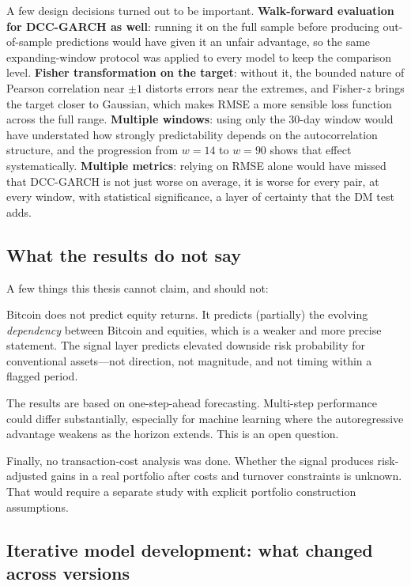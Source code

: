 A few design decisions turned out to be important. \textbf{Walk-forward evaluation for DCC-GARCH as well}: running it on the full sample before producing out-of-sample predictions would have given it an unfair advantage, so the same expanding-window protocol was applied to every model to keep the comparison level. \textbf{Fisher transformation on the target}: without it, the bounded nature of Pearson correlation near $\pm 1$ distorts errors near the extremes, and Fisher-$z$ brings the target closer to Gaussian, which makes RMSE a more sensible loss function across the full range. \textbf{Multiple windows}: using only the 30-day window would have understated how strongly predictability depends on the autocorrelation structure, and the progression from $w=14$ to $w=90$ shows that effect systematically. \textbf{Multiple metrics}: relying on RMSE alone would have missed that DCC-GARCH is not just worse on average, it is worse for every pair, at every window, with statistical significance, a layer of certainty that the DM test adds.

\subsection{What the results do not say}

A few things this thesis cannot claim, and should not:

Bitcoin does not predict equity returns. It predicts (partially) the evolving \emph{dependency} between Bitcoin and equities, which is a weaker and more precise statement. The signal layer predicts elevated downside risk probability for conventional assets---not direction, not magnitude, and not timing within a flagged period.

The results are based on one-step-ahead forecasting. Multi-step performance could differ substantially, especially for machine learning where the autoregressive advantage weakens as the horizon extends. This is an open question.

Finally, no transaction-cost analysis was done. Whether the signal produces risk-adjusted gains in a real portfolio after costs and turnover constraints is unknown. That would require a separate study with explicit portfolio construction assumptions.

\subsection{Iterative model development: what changed across versions}
\label{subsec:iterations}

